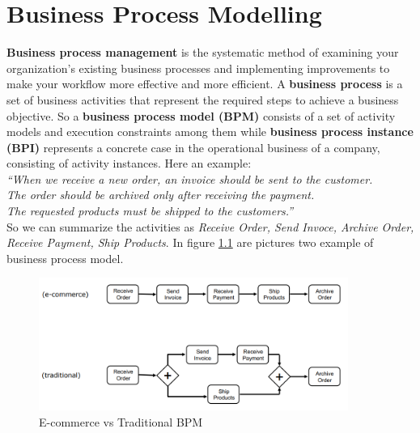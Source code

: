 \documentclass[10pt,a4paper]{report}
\begin{document}
\chapter{Business Process Modelling}
\textbf{Business process management} is the systematic method of examining your organization's existing business
processes and implementing improvements to make your workflow more effective and more efficient.
A \textbf{business process} is a set of business activities that represent the required steps to achieve a business objective.
So a \textbf{business process model (BPM)} consists of a set of activity models and execution constraints among them while \textbf{business process instance (BPI)} represents a concrete case in the operational business of a company, consisting of activity instances.
Here an example:\\
\textit{“When we receive a new order, an invoice should be sent to the customer.\\The order should be archived only after receiving the payment.\\
	The requested products must be shipped to the customers.”}\\
So we can summarize the activities as \textit{Receive Order, Send Invoce, Archive Order, Receive Payment, Ship Products}. 
In figure \ref{image73} are pictures two example of business process model. 
\begin{figure}[h]
	\centering
	\includegraphics[width=0.9\textwidth]{image73}
	\caption{E-commerce vs Traditional BPM}
	\label{image73}
\end{figure}
\end{document}
